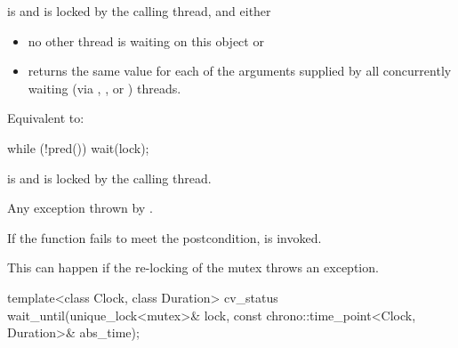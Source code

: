 \begin{itemdescr}
\pnum
\expects
{} is  and  is
locked by the calling thread, and either
\begin{itemize}
\item no other thread is waiting on this  object or
\item {} returns the same value for each of the 
arguments supplied by all concurrently waiting (via ,
, or ) threads.
\end{itemize}

\pnum
\effects
Equivalent to:
\begin{codeblock}
while (!pred())
  wait(lock);
\end{codeblock}

\pnum
\ensures
{} is  and 
is locked by the calling thread.

\pnum
\throws
Any exception thrown by .

\pnum
\remarks
If the function fails to meet the postcondition, 
is invoked.
\begin{note}
This can happen if the re-locking of the mutex throws an exception.
\end{note}
\end{itemdescr}

%
\begin{itemdecl}
template<class Clock, class Duration>
  cv_status wait_until(unique_lock<mutex>& lock,
                       const chrono::time_point<Clock, Duration>& abs_time);
\end{itemdecl}

